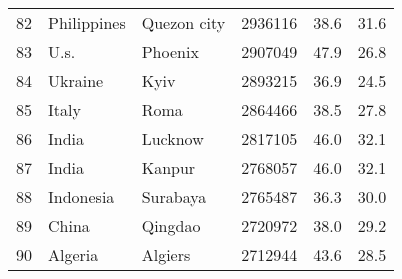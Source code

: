 \begin{center}
\begin{longtable}{clllcc}
        82                                       & Philippines                          & Quezon city                       & 2936116                                 & 38.6                                  & 31.6                                  \\
        83                                       & U.s.                                 & Phoenix                           & 2907049                                 & 47.9                                  & 26.8                                  \\
        84                                       & Ukraine                              & Kyiv                              & 2893215                                 & 36.9                                  & 24.5                                  \\
        85                                       & Italy                                & Roma                              & 2864466                                 & 38.5                                  & 27.8                                  \\
        86                                       & India                                & Lucknow                           & 2817105                                 & 46.0                                  & 32.1                                  \\
        87                                       & India                                & Kanpur                            & 2768057                                 & 46.0                                  & 32.1                                  \\
        88                                       & Indonesia                            & Surabaya                          & 2765487                                 & 36.3                                  & 30.0                                  \\
        89                                       & China                                & Qingdao                           & 2720972                                 & 38.0                                  & 29.2                                  \\
        90                                       & Algeria                              & Algiers                           & 2712944                                 & 43.6                                  & 28.5                                  \\

\end{longtable}
\end{center}
